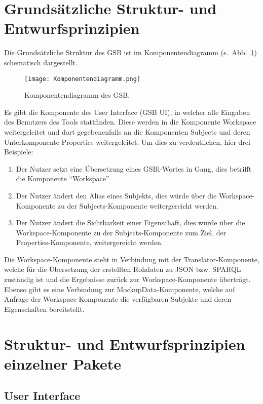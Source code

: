 \section{Grundsätzliche Struktur- und Entwurfsprinzipien}

Die Grundsätzliche Struktur des GSB ist im Komponentendiagramm
(s.~Abb.~\ref{fig02}) schematisch dargestellt.

\begin{figure}[h]%
\texttt{[image: Komponentendiagramm.png]}
\caption{Komponentendiagramm des GSB.}
\label{fig02}
\end{figure}


Es gibt die Komponente des User Interface (GSB UI), in welcher alle
Eingaben des Benutzers des Tools stattfinden. Diese werden in die
Komponente Workspace weitergeleitet und dort gegebenenfalls an die
Komponenten Subjects und deren Unterkomponente Properties
weitergeleitet. Um dies zu verdeutlichen, hier drei Beispiele:
\begin{enumerate}
\item Der Nutzer setzt eine Übersetzung eines GSBl-Wortes in Gang, dies betrifft die Komponente “Workspace”
\item Der Nutzer ändert den Alias eines Subjekts, dies würde über die Workspace-Komponente zu der Subjects-Komponente weitergereicht werden.
\item Der Nutzer ändert die Sichtbarkeit einer Eigenschaft, dies würde über die Workspace-Komponente zu der Subjects-Komponente zum Ziel, der Properties-Komponente, weitergereicht werden.
\end{enumerate}
Die Workspace-Komponente steht in Verbindung mit der
Translator-Komponente, welche für die Übersetzung der erstellten
Rohdaten zu JSON bzw. SPARQL zuständig ist und die Ergebnisse zurück
zur Workspace-Komponente überträgt.
Ebenso gibt es eine Verbindung zur MockupData-Komponente, welche auf
Anfrage der Workspace-Komponente die verfügbaren Subjekte und deren
Eigenschaften bereitstellt.


\section{Struktur- und Entwurfsprinzipien einzelner Pakete}

\subsection*{User Interface}

